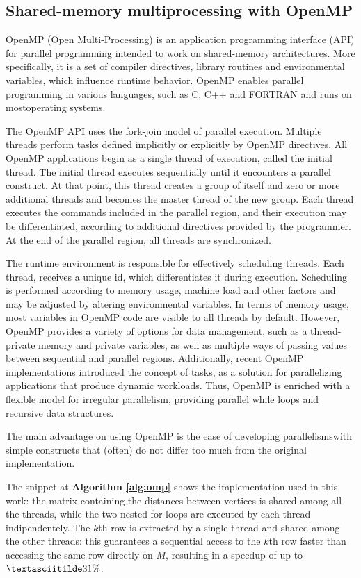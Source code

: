 \subsection{Shared-memory multiprocessing with OpenMP}
OpenMP (Open Multi-Processing) is an application programming
interface (API) for parallel programming intended to work on shared-memory architectures. More specifically, it is a set of compiler
directives, library routines and environmental variables, which influence runtime behavior. OpenMP enables parallel programming in
various languages, such as C, C++ and FORTRAN and runs on mostoperating systems. \par
The OpenMP API uses the fork-join model of parallel execution.
Multiple threads perform tasks defined implicitly or explicitly by OpenMP directives. All OpenMP applications begin as a single thread
of execution, called the initial thread. The initial thread executes sequentially until it encounters a parallel construct. At that point,
this thread creates a group of itself and zero or more additional threads and becomes the master thread of the new group. Each thread
executes the commands included in the parallel region, and their execution may be differentiated, according to additional directives
provided by the programmer. At the end of the parallel region, all threads are synchronized. \par
The runtime environment is responsible for effectively scheduling threads. Each thread, receives a unique id, which differentiates it
during execution. Scheduling is performed according to memory usage, machine load and other factors and may be adjusted by altering
environmental variables. In terms of memory usage, most variables in OpenMP code are visible to all threads by default. 
However, OpenMP provides a variety of options for data management, such as a thread-private memory and private variables, as well as multiple ways of
passing values between sequential and parallel regions. Additionally, recent OpenMP implementations introduced the concept of tasks,
as a solution for parallelizing applications that produce dynamic workloads. 
Thus, OpenMP is enriched with a flexible model for irregular parallelism, providing parallel while loops and recursive data structures. \par
The main advantage on using OpenMP is the ease of developing parallelismswith simple constructs that (often) do not differ too much from the original implementation.

The snippet at \textbf{Algorithm \ref*{alg:omp}} shows the implementation used in this work: the matrix containing the
distances between vertices is shared among all the threads, while the two nested for-loops are executed
by each thread indipendentely. The $k$th row is extracted by a single thread and shared among the other threads: this
guarantees a sequential access to the $k$th row faster than accessing the same row directly on $M$, resulting in a speedup of up to $\textasciitilde31\%$.

